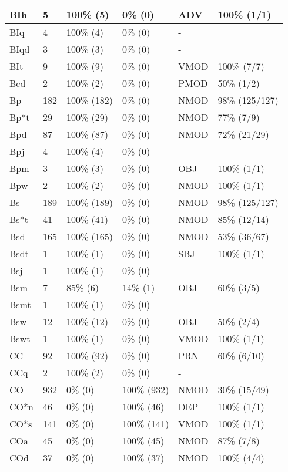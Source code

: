 \begin{figure*}
\begin{tabular}{|l|l|l|l||l|l|}
 BIh & 5 & 100\% (5) & 0\% (0) & ADV & 100\% (1/1) \\ 
\hline
 BIq & 4 & 100\% (4) & 0\% (0) & - &  \\ 
\hline
 BIqd & 3 & 100\% (3) & 0\% (0) & - &  \\ 
\hline
 BIt & 9 & 100\% (9) & 0\% (0) & VMOD & 100\% (7/7) \\ 
\hline
 Bcd & 2 & 100\% (2) & 0\% (0) & PMOD & 50\% (1/2) \\ 
\hline
 Bp & 182 & 100\% (182) & 0\% (0) & NMOD & 98\% (125/127) \\ 
\hline
 Bp*t & 29 & 100\% (29) & 0\% (0) & NMOD & 77\% (7/9) \\ 
\hline
 Bpd & 87 & 100\% (87) & 0\% (0) & NMOD & 72\% (21/29) \\ 
\hline
 Bpj & 4 & 100\% (4) & 0\% (0) & - &  \\ 
\hline
 Bpm & 3 & 100\% (3) & 0\% (0) & OBJ & 100\% (1/1) \\ 
\hline
 Bpw & 2 & 100\% (2) & 0\% (0) & NMOD & 100\% (1/1) \\ 
\hline
 Bs & 189 & 100\% (189) & 0\% (0) & NMOD & 98\% (125/127) \\ 
\hline
 Bs*t & 41 & 100\% (41) & 0\% (0) & NMOD & 85\% (12/14) \\ 
\hline
 Bsd & 165 & 100\% (165) & 0\% (0) & NMOD & 53\% (36/67) \\ 
\hline
 Bsdt & 1 & 100\% (1) & 0\% (0) & SBJ & 100\% (1/1) \\ 
\hline
 Bsj & 1 & 100\% (1) & 0\% (0) & - &  \\ 
\hline
 Bsm & 7 & 85\% (6) & 14\% (1) & OBJ & 60\% (3/5) \\ 
\hline
 Bsmt & 1 & 100\% (1) & 0\% (0) & - &  \\ 
\hline
 Bsw & 12 & 100\% (12) & 0\% (0) & OBJ & 50\% (2/4) \\ 
\hline
 Bswt & 1 & 100\% (1) & 0\% (0) & VMOD & 100\% (1/1) \\ 
\hline
 CC & 92 & 100\% (92) & 0\% (0) & PRN & 60\% (6/10) \\ 
\hline
 CCq & 2 & 100\% (2) & 0\% (0) & - &  \\ 
\hline
 CO & 932 & 0\% (0) & 100\% (932) & NMOD & 30\% (15/49) \\ 
\hline
 CO*n & 46 & 0\% (0) & 100\% (46) & DEP & 100\% (1/1) \\ 
\hline
 CO*s & 141 & 0\% (0) & 100\% (141) & VMOD & 100\% (1/1) \\ 
\hline
 COa & 45 & 0\% (0) & 100\% (45) & NMOD & 87\% (7/8) \\ 
\hline
 COd & 37 & 0\% (0) & 100\% (37) & NMOD & 100\% (4/4) \\ 
\hline
\end{tabular}
\end{figure*}
